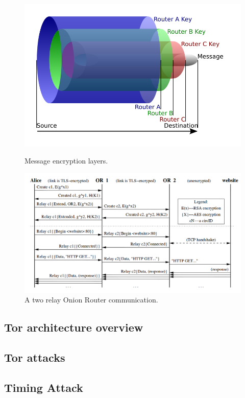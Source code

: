 \begin{figure}[H]
	\centering
	\includegraphics[scale=0.30]{onion.png}
	\caption{Message encryption layers.}
	\label{fig:onion}
	\includegraphics[scale=0.30]{or-communication.png}
	\caption{A two relay Onion Router communication.\cite{dingledine2004tor}}
\end{figure}	

\subsection{Tor architecture overview}


\subsection{Tor attacks}

\subsection{Timing Attack}
